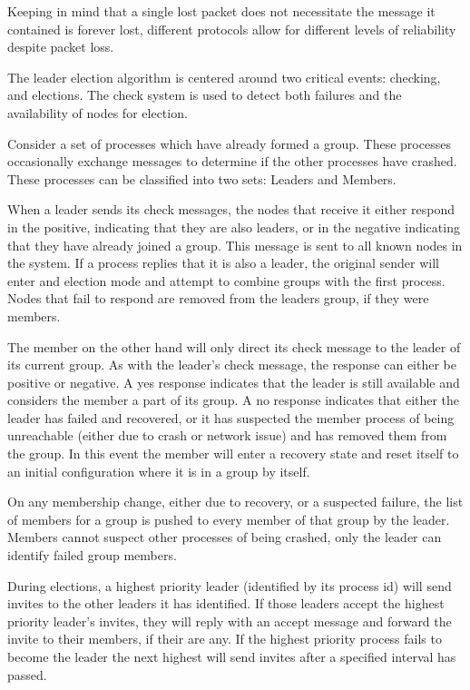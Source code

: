 Keeping in mind that a single lost packet does not necessitate the message it 
contained is forever lost, different protocols allow for different levels of 
reliability despite packet loss.

The leader election algorithm is centered around two critical events: checking, 
and elections. The check system is used to detect both failures and the 
availability of nodes for election.

Consider a set of processes which have already formed a group. These processes 
occasionally exchange messages to determine if the other processes have 
crashed. These processes can be classified into two sets: Leaders and Members.

When a leader sends its check messages, the nodes that receive it either 
respond in the positive, indicating that they are also leaders, or in the 
negative indicating that they have already joined a group. This message is sent 
to all known nodes in the system. If a process replies that it is also a 
leader, the original sender will enter and election mode and attempt to combine 
groups with the first process. Nodes that fail to respond are removed from the 
leaders group, if they were members.

The member on the other hand will only direct its check message to the leader 
of its current group. As with the leader's check message, the response can 
either be positive or negative. A yes response indicates that the leader is 
still available and considers the member a part of its group. A no response 
indicates that either the leader has failed and recovered, or it has suspected 
the member process of being unreachable (either due to crash or network issue) 
and has removed them from the group. In this event the member will enter a 
recovery state and reset itself to an initial configuration where it is in a 
group by itself.

On any membership change, either due to recovery, or a suspected failure, the 
list of members for a group is pushed to every member of that group by the 
leader. Members cannot suspect other processes of being crashed, only the 
leader can identify failed group members.

During elections, a highest priority leader (identified by its process id) will 
send invites to the other leaders it has identified. If those leaders accept 
the highest priority leader's invites, they will reply with an accept message 
and forward the invite to their members, if their are any. If the highest 
priority process fails to become the leader the next highest will send invites 
after a specified interval has passed.

